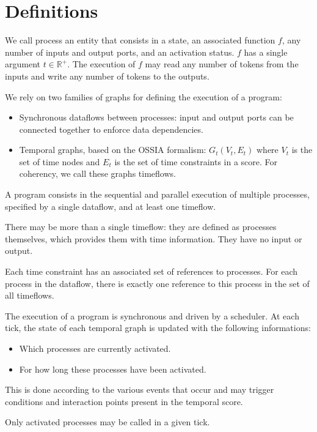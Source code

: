 \documentclass{article}
\begin{document}
\section{Definitions}
We call process an entity that consists in a state, an associated function $f$, any number of inputs and output ports, and an activation status.
$f$ has a single argument $t \in \mathbb{R^+}$.
The execution of $f$ may read any number of tokens from the inputs and write any number of tokens to the outputs.
    
We rely on two families of graphs for defining the execution of a program:
    
\begin{itemize}
  \item Synchronous dataflows between processes: input and output ports can be connected together to enforce data dependencies.
  \item Temporal graphs, based on the OSSIA formalism: $G_t(V_t, E_t)$ where $V_t$ is the set of time nodes and $E_t$ is the set of time constraints in a score. 
        For coherency, we call these graphs timeflows.
\end{itemize}

A program consists in the sequential and parallel execution of multiple processes, specified by a single dataflow, and at least one timeflow.
    
There may be more than a single timeflow: they are defined as processes themselves, which provides them with time information.
They have no input or output.
    
Each time constraint has an associated set of references to processes.
For each process in the dataflow, there is exactly one reference to this process in the set of all timeflows.
    
The execution of a program is synchronous and driven by a scheduler.
At each tick, the state of each temporal graph is updated with the following informations:
    
\begin{itemize}
  \item Which processes are currently activated.
  \item For how long these processes have been activated.
\end{itemize}

This is done according to the various events that occur and may trigger conditions and interaction points present in the temporal score.
    
Only activated processes may be called in a given tick.
    
\end{document}
